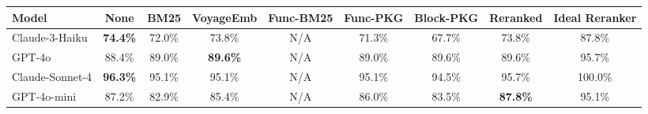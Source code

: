 \begin{tabular}{lcccccccc}
\toprule
\textbf{Model} & \textbf{None} & \textbf{BM25} & \textbf{VoyageEmb} & \textbf{Func-BM25}  & \textbf{Func-PKG} & \textbf{Block-PKG} & \textbf{Reranked} & \textbf{Ideal Reranker} \\
\midrule
Claude-3-Haiku & \cellcolor{gray!0}\textbf{74.4\%} & \cellcolor{OrangeRed!37}72.0\% & \cellcolor{OrangeRed!9}73.8\% & N/A & \cellcolor{OrangeRed!46}71.3\% & \cellcolor{OrangeRed!90}67.7\% & \cellcolor{OrangeRed!9}73.8\% & \cellcolor{BlueViolet!20}87.8\% \\
GPT-4o & 88.4\% \cellcolor{gray!0} & \cellcolor{ForestGreen!9}89.0\% & \cellcolor{ForestGreen!18}\textbf{89.6\%} & N/A & \cellcolor{ForestGreen!9}89.0\% & \cellcolor{ForestGreen!18}89.6\% & \cellcolor{ForestGreen!18}89.6\% & \cellcolor{BlueViolet!20}95.7\% \\
Claude-Sonnet-4 & \cellcolor{gray!0}\textbf{96.3\%} & \cellcolor{OrangeRed!18}95.1\% & \cellcolor{OrangeRed!18}95.1\% & N/A & \cellcolor{OrangeRed!18}95.1\% & \cellcolor{OrangeRed!27}94.5\% & \cellcolor{OrangeRed!9}95.7\% & \cellcolor{BlueViolet!20}100.0\% \\
GPT-4o-mini & 87.2\% \cellcolor{gray!0} & \cellcolor{OrangeRed!64}82.9\% & \cellcolor{OrangeRed!27}85.4\% & N/A & \cellcolor{OrangeRed!18}86.0\% & \cellcolor{OrangeRed!55}83.5\% & \cellcolor{ForestGreen!9}\textbf{87.8\%} & \cellcolor{BlueViolet!20}95.1\% \\
\bottomrule
\end{tabular}